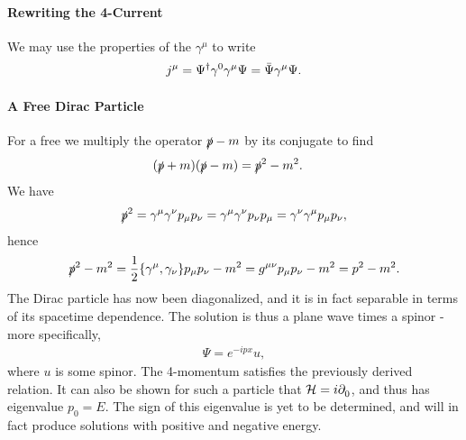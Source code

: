 \paragraph{Rewriting the 4-Current}
We may use the properties of the $\gamma^{\mu}$ to write
\begin{align*}
	j^{\mu} = \Psi^{\dagger}\gamma^{0}\gamma^{\mu}\Psi = \bar{\Psi}\gamma^{\mu}\Psi.
\end{align*}

\paragraph{A Free Dirac Particle}
For a free we multiply the operator $\slashed{p} - m$ by its conjugate to find
\begin{align*}
	(\slashed{p} + m)(\slashed{p} - m) &= \slashed{p}^{2} - m^{2}.
\end{align*}
We have
\begin{align*}
	\slashed{p}^{2} = \gamma^{\mu}\gamma^{\nu}p_{\mu}p_{\nu} = \gamma^{\mu}\gamma^{\nu}p_{\nu}p_{\mu} = \gamma^{\nu}\gamma^{\mu}p_{\mu}p_{\nu},
\end{align*}
hence
\begin{align*}
	\fsl{p}^{2} - m^{2} = \frac{1}{2}\acomm{\gamma^{\mu}}{\gamma_{\nu}}p_{\mu}p_{\nu} - m^{2} = g^{\mu\nu}p_{\mu}p_{\nu} - m^{2} = p^{2} - m^{2}.
\end{align*}
The Dirac particle has now been diagonalized, and it is in fact separable in terms of its spacetime dependence. The solution is thus a plane wave times a spinor - more specifically,
\begin{align*}
	\Psi = e^{-ipx}u,
\end{align*}
where $u$ is some spinor. The 4-momentum satisfies the previously derived relation. It can also be shown for such a particle that $\mathcal{H} = i\partial^{}_{0}{}$, and thus has eigenvalue $p_{0} = E$. The sign of this eigenvalue is yet to be determined, and will in fact produce solutions with positive and negative energy.

